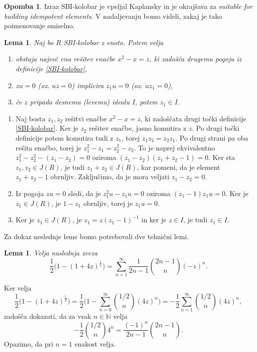 \documentclass[a4paper, 12pt]{amsart}
\theoremstyle{definition} %
\newtheorem{opomba}[definicija]{Opomba}
\theoremstyle{plain} %
\newtheorem{lema}[definicija]{Lema}
\newcommand{\N}{\mathbb N}
\begin{document}
\begin{opomba}
Izraz SBI-kolobar je vpeljal Kaplansky in je okrajšava za \textit{suitable for building idempotent elements}. V nadaljevanju bomo videli, zakaj je tako poimenovanje smiselno.
\end{opomba}

\begin{lema}
\label{SBIlastnosti}
Naj bo $R$ SBI-kolobar z enoto. Potem velja
\begin{enumerate}
\item obstaja največ ena rešitev enačbe $x^2 - x = z$, ki zadošča drugemu pogoju iz definicije \ref{SBI-kolobar},
\item $zu = 0$ (oz. $uz = 0$) implicira  $z_1 u = 0$ (oz. $uz_1=0$),
\item če $z$ pripada desnemu (levemu) idealu $I$, potem $z_1\in I$.
\end{enumerate}
\end{lema}

\proof
\begin{enumerate}
\item Naj bosta $z_1, z_2$ rešitvi enačbe $x^2 -x = z$, ki zadoščata drugi točki definicije \ref{SBI-kolobar}. Ker je $z_2$ rešitev enačbe, jasno komutira z $z$. Po drugi točki definicije potem komutira tudi z $z_1$, torej $z_1 z_2 = z_2 z_1$. Po drugi strani pa oba rešita enačbo, torej je $z_1^2 - z_1 = z_2^2 - z_2$. To je naprej ekvivalentno $z_1^2 - z_2^2 - (z_1 - z_2) = 0$ oziroma $(z_1 - z_2)(z_1 +z_2 -1)=0$. Ker sta $z_1, z_2\in J(R)$, je tudi $z_1 + z_2 \in J(R)$, kar pomeni, da je element $z_1 + z_2 - 1$ obrnljiv. Zaključimo, da je mora veljati $z_1 - z_2 = 0$.
\item Iz pogoja $zu = 0$ sledi, da je $z_1^2 u - z_1 u = 0$ oziroma $(z_1 - 1)z_1 u = 0$. Ker je $z_1\in J(R)$, je $1- z_1$ obrnljiv, torej je $z_1 u = 0$.  
\item Ker je $z_1 \in J(R)$, je $z_1 = z(z_1 - 1)^{-1}$ in ker je $z\in I$, je tudi $z_1 \in I$.
\end{enumerate}
\endproof

Za dokaz neslednje leme bomo potrebovali dve tehnični lemi.
\begin{lema}
\label{SBItehnicna1}
Velja naslednja zveza
$$
\frac{1}{2}\big( 1- (1+4z)^{\frac{1}{2}}\big) = \sum_{n=1}^{\infty} \frac{1}{2n-1} \binom{2n-1}{n}(-z)^n.
$$
\end{lema}

\proof
Ker velja 
$$
\frac{1}{2}\big( 1- (1+4z)^{\frac{1}{2}}\big) = \frac{1}{2}\big( 1 - \sum_{n=0}^{\infty} {1/2 \choose n} (4z)^n \big) = -\frac{1}{2} \sum_{n=1}^{\infty} {1/2 \choose n} (4z)^n,
$$
zadošča dokazati, da za vsak $n\in \N$ velja
$$
-\frac{1}{2} {1/2 \choose n} 4^n = \frac{(-1)^n}{2n-1} {2n-1 \choose n}.
$$
Opazimo, da pri $n=1$ enakost velja.
\end{document}
